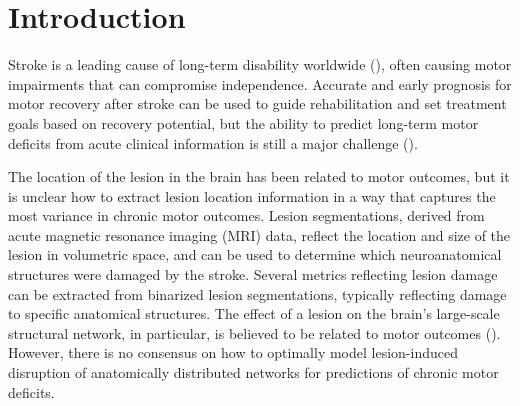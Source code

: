 \documentclass[10pt]{article}
\begin{document}
\section{Introduction}
Stroke is a leading cause of long-term disability worldwide (\cite{Katan2018-qn}), often causing motor impairments that can compromise independence. Accurate and early prognosis for motor recovery after stroke can be used to guide rehabilitation and set treatment goals based on recovery potential, but the ability to predict long-term motor deficits from acute clinical information is still a major challenge (\cite{Stinear2017-eg}).

The location of the lesion in the brain has been related to motor outcomes, but it is unclear how to extract lesion location information in a way that captures the most variance in chronic motor outcomes. Lesion segmentations, derived from acute magnetic resonance imaging (MRI) data, reflect the location and size of the lesion in volumetric space, and can be used to determine which neuroanatomical structures were damaged by the stroke. Several metrics reflecting lesion damage can be extracted from binarized lesion segmentations, typically reflecting damage to specific anatomical structures. The effect of a lesion on the brain's large-scale structural network, in particular, is believed to be related to motor outcomes (\cite{Kuceyeski2016-vj, Griffis2019-cy, Salvalaggio2020-pe, Bowren2022-rs}). However, there is no consensus on how to optimally model lesion-induced disruption of anatomically distributed networks for predictions of chronic motor deficits. 
\end{document}
